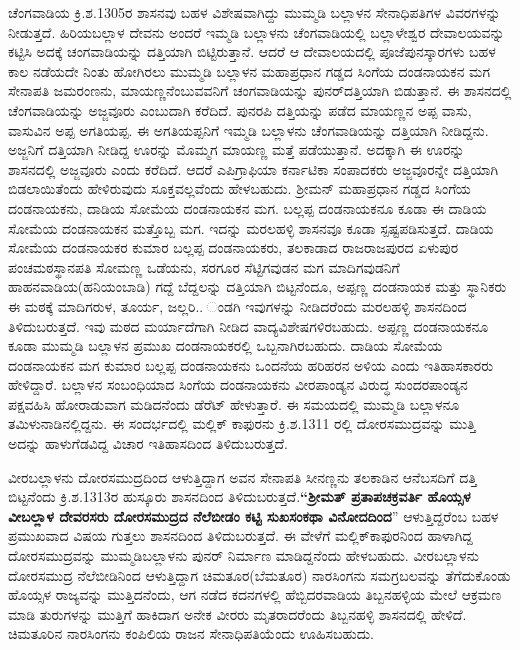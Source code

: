 ಚೆಂಗವಾಡಿಯ ಕ್ರಿ.ಶ.1305ರ ಶಾಸನವು ಬಹಳ ವಿಶೇಷವಾಗಿದ್ದು ಮುಮ್ಮಡಿ ಬಲ್ಲಾಳನ ಸೇನಾಧಿಪತಿಗಳ ವಿವರಗಳನ್ನು ನೀಡುತ್ತದೆ. ಹಿರಿಯಬಲ್ಲಾಳ ದೇವನು ಅಂದರೆ ಇಮ್ಮಡಿ ಬಲ್ಲಾಳನು ಚೆಂಗವಾಡಿಯಲ್ಲಿ ಬಲ್ಲಾಳೇಶ್ವರ ದೇವಾಲಯವನ್ನು ಕಟ್ಟಿಸಿ ಅದಕ್ಕೆ ಚಂಗವಾಡಿಯನ್ನು ದತ್ತಿಯಾಗಿ ಬಿಟ್ಟಿರುತ್ತಾನೆ. ಆದರೆ ಆ ದೇವಾಲಯದಲ್ಲಿ ಪೂಜೆಪುನಸ್ಕಾರಗಳು ಬಹಳ ಕಾಲ ನಡೆಯದೇ ನಿಂತು ಹೋಗಿರಲು ಮುಮ್ಮಡಿ ಬಲ್ಲಾಳನ ಮಹಾಪ್ರಧಾನ ಗಡ್ಡದ ಸಿಂಗೆಯ ದಂಡನಾಯಕನ ಮಗ ಸೇನಾಪತಿ ಜಮರಂಣನು, ಮಾಯಣ್ಣನೆಂಬುವವನಿಗೆ ಚಂಗವಾಡಿಯನ್ನು ಪುನರ್​ದತ್ತಿಯಾಗಿ ಬಿಡುತ್ತಾನೆ. ಈ ಶಾಸನದಲ್ಲಿ ಚೆಂಗವಾಡಿಯನ್ನು ಅಜ್ಜವೂರು ಎಂಬುದಾಗಿ ಕರೆದಿದೆ. ಪುನರಪಿ ದತ್ತಿಯನ್ನು ಪಡೆದ ಮಾಯಣ್ಣನ ಅಪ್ಪ ವಾಸು, ವಾಸುವಿನ ಅಪ್ಪ ಅಗತಿಯಪ್ಪ. ಈ ಅಗತಿಯಪ್ಪನಿಗೆ ಇಮ್ಮಡಿ ಬಲ್ಲಾಳನು ಚೆಂಗವಾಡಿಯನ್ನು ದತ್ತಿಯಾಗಿ ನೀಡಿದ್ದನು. ಅಜ್ಜನಿಗೆ ದತ್ತಿಯಾಗಿ ನೀಡಿದ್ದ ಊರನ್ನು ಮೊಮ್ಮಗ ಮಾಯಣ್ಣ ಮತ್ತೆ ಪಡೆಯುತ್ತಾನೆ. ಅದಕ್ಕಾಗಿ ಈ ಊರನ್ನು ಶಾಸನದಲ್ಲಿ ಅಜ್ಜವೂರು ಎಂದು ಕರೆದಿದೆ. ಆದರೆ ಎಪಿಗ್ರಾಫಿಯಾ ಕರ್ನಾಟಿಕಾ ಸಂಪಾದಕರು ಅಜ್ಜವೂರನ್ನೇ ದತ್ತಿಯಾಗಿ ಬಿಡಲಾಯಿತೆಂದು ಹೇಳಿರುವುದು ಸೂಕ್ತವಲ್ಲವೆಂದು ಹೇಳಬಹುದು. ಶ‍್ರೀಮನ್​ ಮಹಾಪ್ರಧಾನ ಗಡ್ಡದ ಸಿಂಗೆಯ ದಂಡನಾಯಕನು, ದಾಡಿಯ ಸೋಮೆಯ ದಂಡನಾಯಕನ ಮಗ. ಬಲ್ಲಪ್ಪ ದಂಡನಾಯಕನೂ ಕೂಡಾ ಈ ದಾಡಿಯ ಸೋಮೆಯ ದಂಡನಾಯಕನ ಮತ್ತೊಬ್ಬ ಮಗ. ಇದನ್ನು ಮರಲಹಳ್ಳಿ ಶಾಸನವೂ ಕೂಡಾ ಸ್ಪಷ್ಟಪಡಿಸುತ್ತದೆ. ದಾಡಿಯ ಸೋಮೆಯ ದಂಡನಾಯಕರ ಕುಮಾರ ಬಲ್ಲಪ್ಪ ದಂಡನಾಯಕರು, ತಲಕಾಡಾದ ರಾಜರಾಜಪುರದ ಏಳುಪುರ ಪಂಚಮಠಸ್ಥಾನಪತಿ ಸೋಮಣ್ಣ ಒಡೆಯನು, ಸರಗೂರ ಸೆಟ್ಟಿಗವುಡನ ಮಗ ಮಾದಿಗವುಡನಿಗೆ ಹಾಹನವಾಡಿಯ(ಹನಿಯಂಬಾಡಿ) ಗದ್ದೆ ಬೆದ್ದಲನ್ನು ದತ್ತಿಯಾಗಿ ಬಿಟ್ಟನೆಂದೂ, ಅಪ್ಪಣ್ಣ ದಂಡನಾಯಕ ಮತ್ತು ಸ್ಥಾನಿಕರು ಈ ಮಠಕ್ಕೆ ಮಾದಿಗರುಳ, ತೂರ್ಯ, ಜಲ್ಲರಿ.. ಂಡಗಿ ಇವುಗಳನ್ನು ನೀಡಿದರೆಂದು ಮರಲಹಳ್ಳಿ ಶಾಸನದಿಂದ ತಿಳಿದುಬರುತ್ತದೆ. ಇವು ಮಠದ ಮರ್ಯಾದೆಗಾಗಿ ನೀಡಿದ ವಾದ್ಯವಿಶೇಷಗಳಿರಬಹುದು. ಅಪ್ಪಣ್ಣ ದಂಡನಾಯಕನೂ ಕೂಡಾ ಮುಮ್ಮಡಿ ಬಲ್ಲಾಳನ ಪ್ರಮುಖ ದಂಡನಾಯಕರಲ್ಲಿ ಒಬ್ಬನಾಗಿರಬಹುದು. ದಾಡಿಯ ಸೋಮೆಯ ದಂಡನಾಯಕನ ಮಗ ಕುಮಾರ ಬಲ್ಲಪ್ಪ ದಂಡನಾಯಕನು ಒಂದನೆಯ ಹರಿಹರನ ಅಳಿಯ ಎಂದು ಇತಿಹಾಸಕಾರರು ಹೇಳಿದ್ದಾರೆ. ಬಲ್ಲಾಳನ ಸಂಬಂಧಿಯಾದ ಸಿಂಗೆಯ ದಂಡನಾಯಕನು ವೀರಪಾಂಡ್ಯನ ವಿರುದ್ಧ ಸುಂದರಪಾಂಡ್ಯನ ಪಕ್ಷವಹಿಸಿ ಹೋರಾಡುವಾಗ ಮಡಿದನೆಂದು ಡೆರೆಟ್​ ಹೇಳುತ್ತಾರೆ. ಈ ಸಮಯದಲ್ಲಿ ಮುಮ್ಮಡಿ ಬಲ್ಲಾಳನೂ ತಮಿಳುನಾಡಿನಲ್ಲಿದ್ದನು. ಈ ಸಂದರ್ಭದಲ್ಲಿ ಮಲ್ಲಿಕ್​ ಕಾಫುರನು ಕ್ರಿ.ಶ.1311 ರಲ್ಲಿ ದೋರಸಮುದ್ರವನ್ನು ಮುತ್ತಿ ಅದನ್ನು ಹಾಳುಗೆಡವಿದ್ದ ವಿಚಾರ ಇತಿಹಾಸದಿಂದ ತಿಳಿದುಬರುತ್ತದೆ.

ವೀರಬಲ್ಲಾಳನು ದೋರಸಮುದ್ರದಿಂದ ಆಳುತ್ತಿದ್ದಾಗ ಅವನ ಸೇನಾಪತಿ ಸೀನಣ್ಣನು ತಲಕಾಡಿನ ಆನೆಬಸದಿಗೆ ದತ್ತಿ ಬಿಟ್ಟನೆಂದು ಕ್ರಿ.ಶ.1313ರ ಹುಸ್ಕೂರು ಶಾಸನದಿಂದ ತಿಳಿದುಬರುತ್ತದೆ.\textbf{“ಶ‍್ರೀಮತ್​ ಪ್ರತಾಪಚಕ್ರವರ್ತಿ ಹೊಯ್ಸಳ ವೀಬಲ್ಲಾಳ ದೇವರಸರು ದೋರಸಮುದ್ರದ ನೆಲೆಬೀಡಂ ಕಟ್ಟಿ ಸುಖಸಂಕಥಾ ವಿನೋದದಿಂದ}” ಆಳುತ್ತಿದ್ದರೆಂಬ ಬಹಳ ಪ್ರಮುಖ\-ವಾದ ವಿಷಯ ಗುತ್ತಲು ಶಾಸನದಿಂದ ತಿಳಿದುಬರುತ್ತದೆ. ಈ ವೇಳೆಗೆ ಮಲ್ಲಿಕ್​ಕಾಫುರನಿಂದ ಹಾಳಾಗಿದ್ದ ದೋರಸಮುದ್ರವನ್ನು ಮುಮ್ಮಡಿಬಲ್ಲಾಳನು ಪುನರ್​ ನಿರ್ಮಾಣ ಮಾಡಿದ್ದನೆಂದು ಹೇಳಬಹುದು. ವೀರಬಲ್ಲಾಳನು ದೋರಸಮುದ್ರ ನೆಲೆಬೀಡಿನಿಂದ ಆಳುತ್ತಿದ್ದಾಗ ಚಿಮತೂರ(ಬೆಮತೂರ) ನಾರಸಿಂಗನು ಸಮಗ್ರಬಲವನ್ನು ತೆಗೆದುಕೊಂಡು ಹೊಯ್ಸಳ ರಾಜ್ಯವನ್ನು ಮುತ್ತಿದನೆಂದು, ಆಗ ನಡೆದ ಕದನಗಳಲ್ಲಿ ಹೆಬ್ಬಿದರವಾಡಿಯ ತಿಬ್ಬನಹಳ್ಳಿಯ ಮೇಲೆ ಆಕ್ರಮಣ ಮಾಡಿ ತುರುಗಳನ್ನು ಮುತ್ತಿಗೆ ಹಾಕಿದಾಗ ಅನೇಕ ವೀರರು ಮೃತರಾದರೆಂದು ತಿಬ್ಬನಹಳ್ಳಿ ಶಾಸನದಲ್ಲಿ ಹೇಳಿದೆ. ಚಿಮತೂರಿನ ನಾರಸಿಂಗನು ಕಂಪಿಲಿಯ ರಾಜನ ಸೇನಾಧಿಪತಿಯೆಂದು ಊಹಿಸಬಹುದು. 

